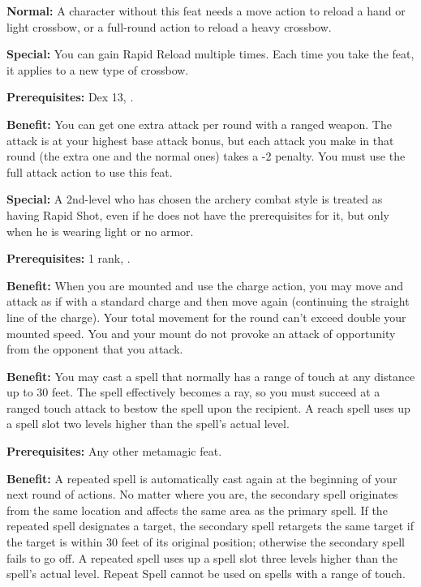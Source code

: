 \textbf{Normal:} A character without this feat needs a move action to reload a 
hand or light crossbow, or a full-round action to reload a heavy crossbow. 

\textbf{Special:} You can gain Rapid Reload multiple times. Each time you take 
the feat, it applies to a new type of crossbow.


\textbf{Prerequisites:} Dex 13, .

\textbf{Benefit:} You can get one extra attack per round with a ranged weapon. 
The attack is at your highest base attack bonus, but each attack you make in that 
round (the extra one and the normal ones) takes a -2 penalty. You must use the 
full attack action to use this feat.

\textbf{Special:} A 2nd-level  who has chosen the archery combat style is treated as having 
Rapid Shot, even if he does not have the prerequisites for it, but only when he 
is wearing light or no armor.


\textbf{Prerequisites:}  1 rank, .

\textbf{Benefit:} When you are mounted and use the charge action, you may move 
and attack as if with a standard charge and then move again (continuing the straight 
line of the charge). Your total movement for the round can't exceed double your 
mounted speed. You and your mount do not provoke an attack of opportunity from 
the opponent that you attack.


\textbf{Benefit:} You may cast a spell that normally has a range of touch at any 
distance up to 30 feet. The spell effectively becomes a ray, so you must succeed 
at a ranged touch attack to bestow the spell upon the recipient. A reach spell 
uses up a spell slot two levels higher than the spell's actual level.


\textbf{Prerequisites:} Any other metamagic feat.

\textbf{Benefit:} A repeated spell is automatically cast again at the beginning 
of your next round of actions. No matter where you are, the secondary spell originates 
from the same location and affects the same area as the primary spell. If the repeated 
spell designates a target, the secondary spell retargets the same target if the target 
is within 30 feet of its original position; otherwise the secondary spell fails 
to go off. A repeated spell uses up a spell slot three levels higher than the spell's 
actual level. Repeat Spell cannot be used on spells with a range of touch.



